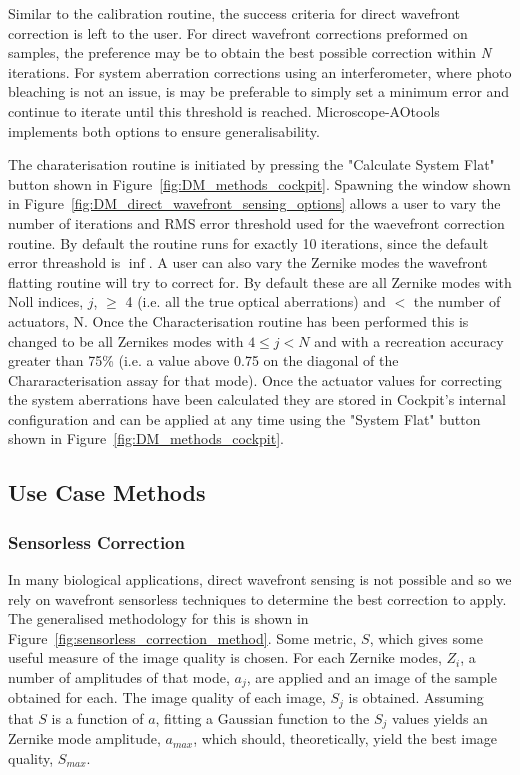 Similar to the calibration routine, the success criteria for direct wavefront correction is left to the user. For direct wavefront corrections preformed on samples, the preference may be to obtain the best possible correction within \textit{N} iterations. For system aberration corrections using an interferometer, where photo bleaching is not an issue, is may be preferable to simply set a minimum error and continue to iterate until this threshold is reached. Microscope-AOtools implements both options to ensure generalisability.

The charaterisation routine is initiated by pressing the "Calculate System Flat" button shown in Figure~\ref{fig:DM_methods_cockpit}. Spawning the window shown in Figure~\ref{fig:DM_direct_wavefront_sensing_options} allows a user to vary the number of iterations and RMS error threshold used for the waevefront correction routine. By default the routine runs for exactly 10 iterations, since the default error threashold is $\inf$. A user can also vary the Zernike modes the wavefront flatting routine will try to correct for. By default these are all Zernike modes with Noll indices, $j$, $\ge$ 4 (i.e. all the true optical aberrations) and $<$ the number of actuators, N. Once the Characterisation routine has been performed this is changed to be all Zernikes modes with $4 \le j < N$ and with a recreation accuracy greater than 75\% (i.e. a value above 0.75 on the diagonal of the Chararacterisation assay for that mode). Once the actuator values for correcting the system aberrations have been calculated they are stored in Cockpit's internal configuration and can be applied at any time using the "System Flat" button shown in Figure~\ref{fig:DM_methods_cockpit}.

\subsection{Use Case Methods}
\label{subsec:use_case_methods}

\subsubsection{Sensorless Correction}
\label{subsubsec:sensorless_correction}

In many biological applications, direct wavefront sensing is not possible and so we rely on wavefront sensorless techniques to determine the best correction to apply. The generalised methodology for this is shown in Figure~\ref{fig:sensorless_correction_method}. Some metric, $S$, which gives some useful measure of the image quality is chosen. For each Zernike modes, $Z_{i}$, a number of amplitudes of that mode, $a_{j}$, are applied and an image of the sample obtained for each. The image quality of each image, $S_{j}$ is obtained. Assuming that $S$ is a function of $a$, fitting a Gaussian function to the $S_{j}$ values yields an Zernike mode amplitude, $a_{max}$, which should, theoretically, yield the best image quality, $S_{max}$. 


